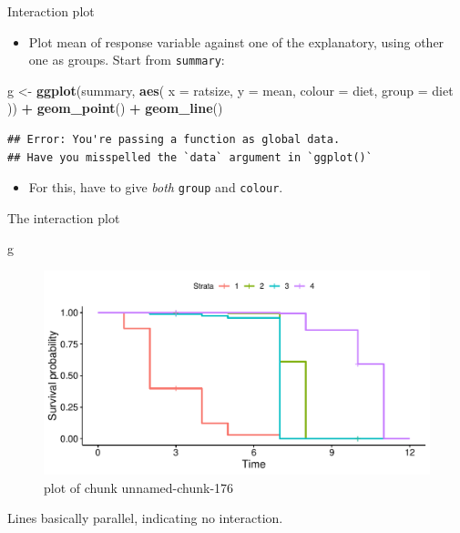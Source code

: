 \documentclass[ignorenonframetext,]{beamer}
\newenvironment{Shaded}{\begin{snugshade}}{\end{snugshade}}
\newcommand{\DataTypeTok}[1]{\textcolor[rgb]{0.13,0.29,0.53}{#1}}
\newcommand{\KeywordTok}[1]{\textcolor[rgb]{0.13,0.29,0.53}{\textbf{#1}}}
\newcommand{\NormalTok}[1]{#1}
\newcommand{\OperatorTok}[1]{\textcolor[rgb]{0.81,0.36,0.00}{\textbf{#1}}}
\newcommand{\StringTok}[1]{\textcolor[rgb]{0.31,0.60,0.02}{#1}}
\providecommand{\tightlist}{%
  \setlength{\itemsep}{0pt}\setlength{\parskip}{0pt}}
\begin{document}
\begin{frame}[fragile]{Interaction plot}
\protect\hypertarget{interaction-plot}{}

\begin{itemize}
\tightlist
\item
  Plot mean of response variable against one of the explanatory, using
  other one as groups. Start from \texttt{summary}:
\end{itemize}

\begin{Shaded}
\begin{Highlighting}[]
\NormalTok{g <-}\StringTok{ }\KeywordTok{ggplot}\NormalTok{(summary, }\KeywordTok{aes}\NormalTok{(}
  \DataTypeTok{x =}\NormalTok{ ratsize, }\DataTypeTok{y =}\NormalTok{ mean,}
  \DataTypeTok{colour =}\NormalTok{ diet, }\DataTypeTok{group =}\NormalTok{ diet}
\NormalTok{)) }\OperatorTok{+}
\StringTok{  }\KeywordTok{geom_point}\NormalTok{() }\OperatorTok{+}\StringTok{ }\KeywordTok{geom_line}\NormalTok{()}
\end{Highlighting}
\end{Shaded}

\begin{verbatim}
## Error: You're passing a function as global data.
## Have you misspelled the `data` argument in `ggplot()`
\end{verbatim}

\begin{itemize}
\tightlist
\item
  For this, have to give \emph{both} \texttt{group} and \texttt{colour}.
\end{itemize}

\end{frame}

\begin{frame}[fragile]{The interaction plot}
\protect\hypertarget{the-interaction-plot}{}

\begin{Shaded}
\begin{Highlighting}[]
\NormalTok{g}
\end{Highlighting}
\end{Shaded}

\begin{figure}
\centering
\includegraphics{figure/unnamed-chunk-176-1.pdf}
\caption{plot of chunk unnamed-chunk-176}
\end{figure}

Lines basically parallel, indicating no interaction.

\end{frame}
\end{document}
